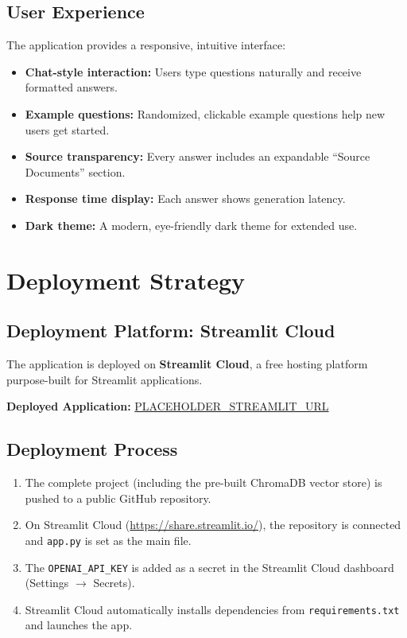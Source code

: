 \documentclass[12pt, a4paper]{article}
\begin{document}
\subsection{User Experience}

The application provides a responsive, intuitive interface:
\begin{itemize}[nosep]
    \item \textbf{Chat-style interaction:} Users type questions naturally and receive formatted answers.
    \item \textbf{Example questions:} Randomized, clickable example questions help new users get started.
    \item \textbf{Source transparency:} Every answer includes an expandable ``Source Documents'' section.
    \item \textbf{Response time display:} Each answer shows generation latency.
    \item \textbf{Dark theme:} A modern, eye-friendly dark theme for extended use.
\end{itemize}


\section{Deployment Strategy}

\subsection{Deployment Platform: Streamlit Cloud}

The application is deployed on \textbf{Streamlit Cloud}, a free hosting platform purpose-built for Streamlit applications.

\textbf{Deployed Application:} \url{PLACEHOLDER_STREAMLIT_URL}

\subsection{Deployment Process}

\begin{enumerate}[nosep]
    \item The complete project (including the pre-built ChromaDB vector store) is pushed to a public GitHub repository.
    \item On Streamlit Cloud (\url{https://share.streamlit.io/}), the repository is connected and \texttt{app.py} is set as the main file.
    \item The \texttt{OPENAI\_API\_KEY} is added as a secret in the Streamlit Cloud dashboard (Settings $\rightarrow$ Secrets).
    \item Streamlit Cloud automatically installs dependencies from \texttt{requirements.txt} and launches the app.
\end{enumerate}
\end{document}

